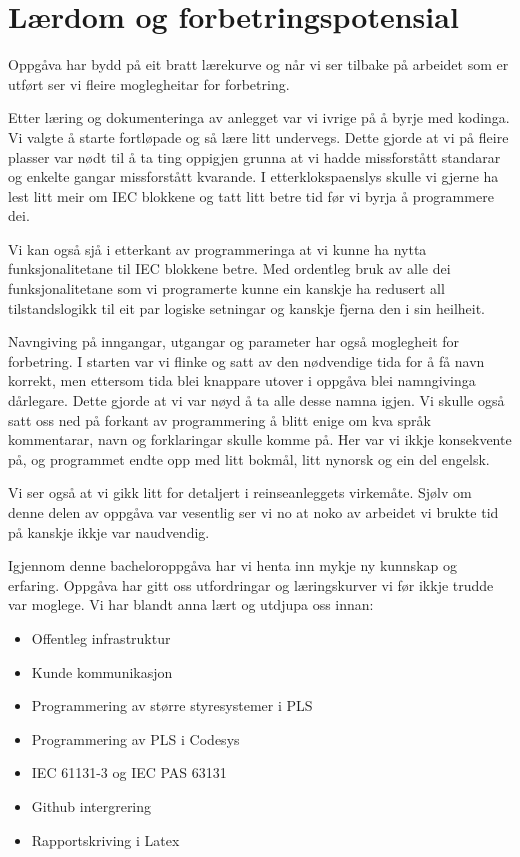 \section{Lærdom og forbetringspotensial}
\thispagestyle{fancy}

Oppgåva har bydd på eit bratt lærekurve og når vi ser tilbake på arbeidet som er utført
ser vi fleire moglegheitar for forbetring.

Etter læring og dokumenteringa av anlegget var vi ivrige på å byrje med kodinga.
Vi valgte å starte fortløpade og så lære litt undervegs.
Dette gjorde at vi på fleire plasser var nødt til å ta ting oppigjen grunna at vi hadde missforstått standarar og enkelte gangar missforstått kvarande.
I etterklokspaenslys skulle vi gjerne ha lest litt meir om IEC blokkene og tatt litt betre tid før vi byrja å programmere dei.

Vi kan også sjå i etterkant av programmeringa at vi kunne ha nytta funksjonalitetane til IEC blokkene betre.
Med ordentleg bruk av alle dei funksjonalitetane som vi programerte kunne ein kanskje ha redusert all tilstandslogikk
til eit par logiske setningar og kanskje fjerna den i sin heilheit.

Navngiving på inngangar, utgangar og parameter har også moglegheit for forbetring.
I starten var vi flinke og satt av den nødvendige tida for å få navn korrekt, men ettersom tida blei knappare utover i oppgåva
blei namngivinga dårlegare. Dette gjorde at vi var nøyd å ta alle desse namna igjen. \newline
Vi skulle også satt oss ned på forkant av programmering å blitt enige om kva språk kommentarar, navn og forklaringar skulle komme på.
Her var vi ikkje konsekvente på, og programmet endte opp med litt bokmål, litt nynorsk og ein del engelsk.

Vi ser også at vi gikk litt for detaljert i reinseanleggets virkemåte.
Sjølv om denne delen av oppgåva var vesentlig ser vi no at noko av arbeidet vi brukte tid på kanskje ikkje var naudvendig.


Igjennom denne bacheloroppgåva har vi henta inn mykje ny kunnskap og erfaring.
Oppgåva har gitt oss utfordringar og læringskurver vi før ikkje trudde var moglege.
Vi har blandt anna lært og utdjupa oss innan:

\begin{itemize}
    \item Offentleg infrastruktur
    \item Kunde kommunikasjon
    \item Programmering av større styresystemer i PLS
    \item Programmering av PLS i Codesys
    \item IEC 61131-3 og IEC PAS 63131
    \item Github intergrering
    \item Rapportskriving i Latex
\end{itemize}

